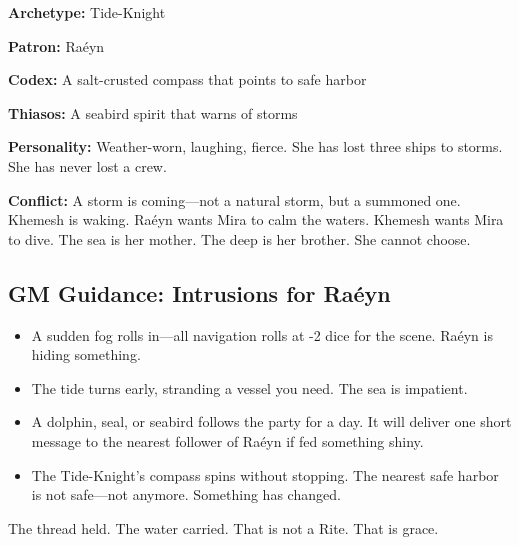\textbf{Archetype:} Tide-Knight

\textbf{Patron:} Raéyn

\textbf{Codex:} A salt-crusted compass that points to safe harbor

\textbf{Thiasos:} A seabird spirit that warns of storms

\textbf{Personality:} Weather-worn, laughing, fierce. She has lost three ships to storms. She has never lost a crew.

\textbf{Conflict:} A storm is coming—not a natural storm, but a summoned one. Khemesh is waking. Raéyn wants Mira to calm the waters. Khemesh wants Mira to dive. The sea is her mother. The deep is her brother. She cannot choose.

\subsection{GM Guidance: Intrusions for Raéyn}

\begin{itemize}
\item A sudden fog rolls in—all navigation rolls at -2 dice for the scene. Raéyn is hiding something.
\item The tide turns early, stranding a vessel you need. The sea is impatient.
\item A dolphin, seal, or seabird follows the party for a day. It will deliver one short message to the nearest follower of Raéyn if fed something shiny.
\item The Tide-Knight's compass spins without stopping. The nearest safe harbor is not safe—not anymore. Something has changed.
\end{itemize}

The thread held. The water carried. That is not a Rite. That is grace.
